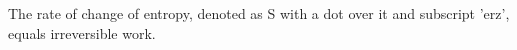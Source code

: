 The rate of change of entropy, denoted as S with a dot over it and subscript 'erz', equals irreversible work.